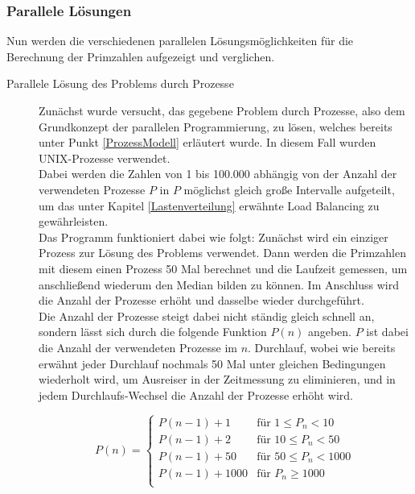 			\subsubsection{Parallele Lösungen}
			
				Nun werden die verschiedenen parallelen Lösungsmöglichkeiten für die Berechnung der Primzahlen aufgezeigt und verglichen.
				
				\begin{description}
					
					\item[Parallele Lösung des Problems durch Prozesse]
					
						Zunächst wurde versucht, das gegebene Problem durch Prozesse, also dem Grundkonzept der parallelen Programmierung, zu lösen, welches bereits unter Punkt \ref{ProzessModell} erläutert wurde. In diesem Fall wurden UNIX-Prozesse verwendet.\\
						Dabei werden die Zahlen von 1 bis 100.000 abhängig von der Anzahl der verwendeten Prozesse $P$ in $P$ möglichst gleich große Intervalle aufgeteilt, um das unter Kapitel \ref{Lastenverteilung} erwähnte Load Balancing zu gewährleisten.\\
						Das Programm funktioniert dabei wie folgt: Zunächst wird ein einziger Prozess zur Lösung des Problems verwendet. Dann werden die Primzahlen mit diesem einen Prozess 50 Mal berechnet und die Laufzeit gemessen, um anschließend wiederum den Median bilden zu können. Im Anschluss wird die Anzahl der Prozesse erhöht und dasselbe wieder durchgeführt.\\
						Die Anzahl der Prozesse steigt dabei nicht ständig gleich schnell an, sondern lässt sich durch die folgende Funktion $P(n)$ angeben. $P$ ist dabei die Anzahl der verwendeten Prozesse im $n$. Durchlauf, wobei wie bereits erwähnt jeder Durchlauf nochmals 50 Mal unter gleichen Bedingungen wiederholt wird, um Ausreiser in der Zeitmessung zu eliminieren, und in jedem Durchlaufs-Wechsel die Anzahl der Prozesse erhöht wird.
						
						\begin{equation}
							P(n) =
							\begin{cases}
								P(n - 1) + 1 & \text{für } 1 \leq P_n < 10\\
								P(n - 1) + 2 & \text{für } 10 \leq P_n < 50\\
								P(n - 1) + 50 & \text{für } 50 \leq P_n < 1000\\
								P(n - 1) + 1000 & \text{für } P_n \geq 1000\\
							\end{cases}
						\end{equation}
						

\end{description}

